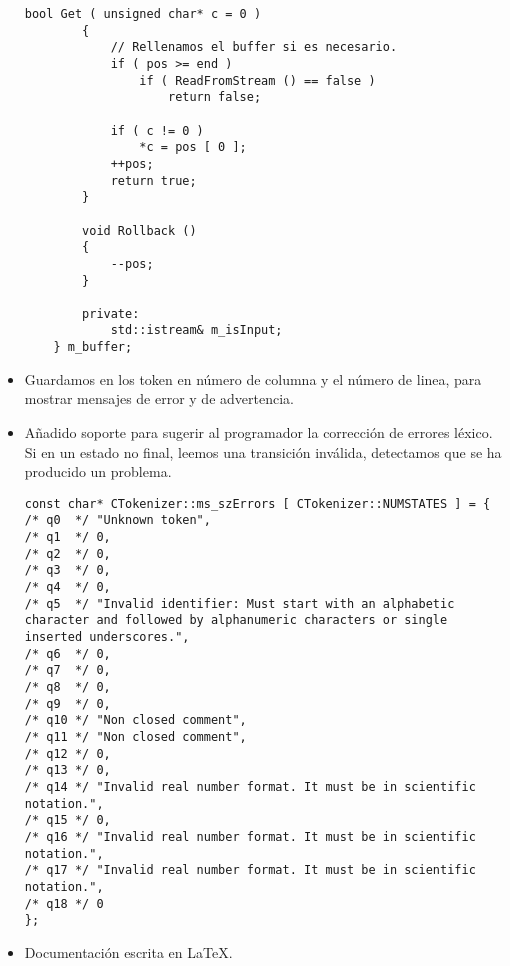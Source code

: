 \begin{itemize}
\begin{lstlisting}[caption={BufferedReader}]
        bool Get ( unsigned char* c = 0 )
        {
            // Rellenamos el buffer si es necesario.
            if ( pos >= end )
                if ( ReadFromStream () == false )
                    return false;

            if ( c != 0 )
                *c = pos [ 0 ];
            ++pos;
            return true;
        }

        void Rollback ()
        {
            --pos;
        }

        private:
            std::istream& m_isInput;
    } m_buffer;
         \end{lstlisting}
    
    \item Guardamos en los token en número de columna y el número de linea, para mostrar mensajes de error y de advertencia. 
    
    \item Añadido soporte para sugerir al programador la corrección de errores léxico. Si en un estado no final, leemos una transición inválida, detectamos que se ha producido un problema.
    
        \begin{lstlisting}[caption={Estructura usada para definir los errores}]
const char* CTokenizer::ms_szErrors [ CTokenizer::NUMSTATES ] = {
/* q0  */ "Unknown token",
/* q1  */ 0,
/* q2  */ 0,
/* q3  */ 0,
/* q4  */ 0,
/* q5  */ "Invalid identifier: Must start with an alphabetic character and followed by alphanumeric characters or single inserted underscores.",
/* q6  */ 0,
/* q7  */ 0,
/* q8  */ 0,
/* q9  */ 0,
/* q10 */ "Non closed comment",
/* q11 */ "Non closed comment",
/* q12 */ 0,
/* q13 */ 0,
/* q14 */ "Invalid real number format. It must be in scientific notation.",
/* q15 */ 0,
/* q16 */ "Invalid real number format. It must be in scientific notation.",
/* q17 */ "Invalid real number format. It must be in scientific notation.",
/* q18 */ 0
};    
        \end{lstlisting}
    
    \item Documentación escrita en \LaTeX.
    
\end{itemize}
